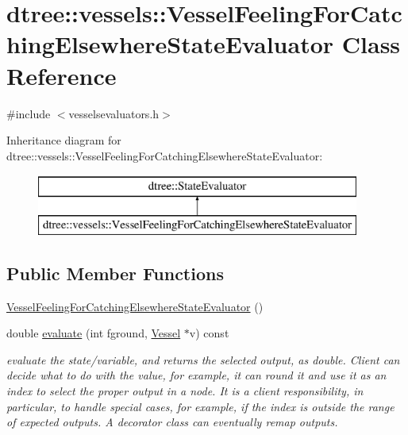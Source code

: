 \hypertarget{classdtree_1_1vessels_1_1_vessel_feeling_for_catching_elsewhere_state_evaluator}{}\section{dtree\+::vessels\+::Vessel\+Feeling\+For\+Catching\+Elsewhere\+State\+Evaluator Class Reference}
\label{classdtree_1_1vessels_1_1_vessel_feeling_for_catching_elsewhere_state_evaluator}


{\ttfamily \#include $<$vesselsevaluators.\+h$>$}

Inheritance diagram for dtree\+::vessels\+::Vessel\+Feeling\+For\+Catching\+Elsewhere\+State\+Evaluator\+:\begin{figure}[H]
\begin{center}
\leavevmode
\includegraphics[height=2.000000cm]{d1/d93/classdtree_1_1vessels_1_1_vessel_feeling_for_catching_elsewhere_state_evaluator}
\end{center}
\end{figure}
\subsection*{Public Member Functions}
\begin{DoxyCompactItemize}
\item 
\mbox{\hyperlink{classdtree_1_1vessels_1_1_vessel_feeling_for_catching_elsewhere_state_evaluator_a910a81dcbd8b5daafd1f8bb884d7fd26}{Vessel\+Feeling\+For\+Catching\+Elsewhere\+State\+Evaluator}} ()
\item 
double \mbox{\hyperlink{classdtree_1_1vessels_1_1_vessel_feeling_for_catching_elsewhere_state_evaluator_af1b9d9f55de1ecf86bce4dd834ec9da3}{evaluate}} (int fground, \mbox{\hyperlink{class_vessel}{Vessel}} $\ast$v) const
\begin{DoxyCompactList}\small\item\em evaluate the state/variable, and returns the selected output, as double. Client can decide what to do with the value, for example, it can round it and use it as an index to select the proper output in a node. It is a client responsibility, in particular, to handle special cases, for example, if the index is outside the range of expected outputs. A decorator class can eventually remap outputs. \end{DoxyCompactList}\end{DoxyCompactItemize}


